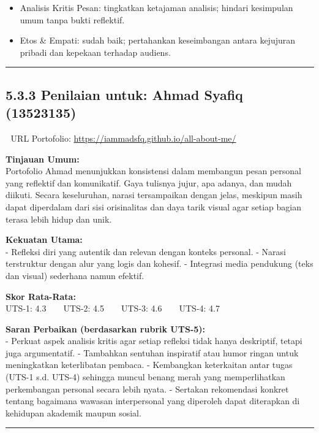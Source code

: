 \documentclass[
  letterpaper,
  DIV=11,
  numbers=noendperiod]{scrreprt}
\begin{document}
\begin{itemize}
\item
  Analisis Kritis Pesan: tingkatkan ketajaman analisis; hindari
  kesimpulan umum tanpa bukti reflektif.
\item
  Etos \& Empati: sudah baik; pertahankan keseimbangan antara kejujuran
  pribadi dan kepekaan terhadap audiens.
\end{itemize}

\begin{center}\rule{0.5\linewidth}{0.5pt}\end{center}

\subsection{5.3.3 Penilaian untuk: Ahmad Syafiq
(13523135)}\label{penilaian-untuk-ahmad-syafiq-13523135}

🔗 URL Portofolio: \url{https://iammadsfq.github.io/all-about-me/}

\textbf{Tinjauan Umum:}\\
Portofolio Ahmad menunjukkan konsistensi dalam membangun pesan personal
yang reflektif dan komunikatif. Gaya tulisnya jujur, apa adanya, dan
mudah diikuti. Secara keseluruhan, narasi tersampaikan dengan jelas,
meskipun masih dapat diperdalam dari sisi orisinalitas dan daya tarik
visual agar setiap bagian terasa lebih hidup dan unik.

\textbf{Kekuatan Utama:}\\
- Refleksi diri yang autentik dan relevan dengan konteks personal. -
Narasi terstruktur dengan alur yang logis dan kohesif. - Integrasi media
pendukung (teks dan visual) sederhana namun efektif.

\textbf{Skor Rata-Rata:}\\
UTS-1: 4.3 \textbar{} UTS-2: 4.5 \textbar{} UTS-3: 4.6 \textbar{} UTS-4:
4.7

\textbf{Saran Perbaikan (berdasarkan rubrik UTS-5):}\\
- Perkuat aspek analisis kritis agar setiap refleksi tidak hanya
deskriptif, tetapi juga argumentatif. - Tambahkan sentuhan inspiratif
atau humor ringan untuk meningkatkan keterlibatan pembaca. - Kembangkan
keterkaitan antar tugas (UTS-1 s.d. UTS-4) sehingga muncul benang merah
yang memperlihatkan perkembangan personal secara lebih nyata. - Sertakan
rekomendasi konkret tentang bagaimana wawasan interpersonal yang
diperoleh dapat diterapkan di kehidupan akademik maupun sosial.

\begin{center}\rule{0.5\linewidth}{0.5pt}\end{center}
\end{document}
